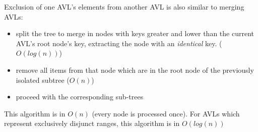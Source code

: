        Exclusion of one AVL's elements from another AVL is also similar to
        merging AVLs:

        \begin{itemize}
            \item split the tree to merge in nodes with keys greater and lower
                than the current AVL's root node's key, extracting the node
                with an \emph{identical} key. ($O(log(n))$)
            \item remove all items from that node which are in the root node
                of the previously isolated subtree ($O(n)$)
            \item proceed with the corresponding sub-trees
        \end{itemize}

        This algorithm is in $O(n)$ (every node is processed once).
        For AVLs which represent exclusively disjunct ranges, this algorithm
        is in $O(log(n))$


